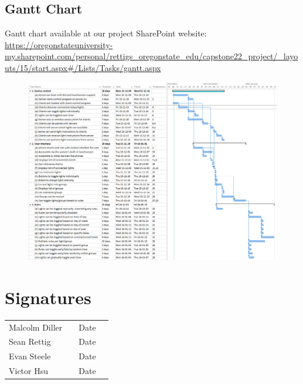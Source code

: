 \documentclass[12pt]{article}
\begin{document}
\subsection{Gantt Chart}
Gantt chart available at our project SharePoint website:
\url{https://oregonstateuniversity-my.sharepoint.com/personal/rettigs_oregonstate_edu/capstone22_project/_layouts/15/start.aspx#/Lists/Tasks/gantt.aspx}
\begin{figure}
\includegraphics[width=1.0\textwidth]{ganttchart.png}
\end{figure}

\pagebreak

\section{Signatures}

\begin{tabular}{l l l l} Malcolm Diller & \underline{\hspace{6cm}} & Date
\underline{\hspace{2cm}}\\ Sean Rettig & \underline{\hspace{6cm}} & Date
\underline{\hspace{2cm}}\\ Evan Steele & \underline{\hspace{6cm}} & Date
\underline{\hspace{2cm}}\\ Victor Hsu & \underline{\hspace{6cm}} & Date
\underline{\hspace{2cm}} \end{tabular}
    
\end{document}
